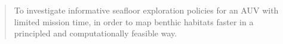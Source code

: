 		\begin{quote}
			To investigate informative seafloor exploration policies for an AUV with limited mission time, in order to map benthic habitats faster in a principled and computationally feasible way.
		\end{quote}
%	
%		
%		
%		
%		
%		
%		
%		
		
